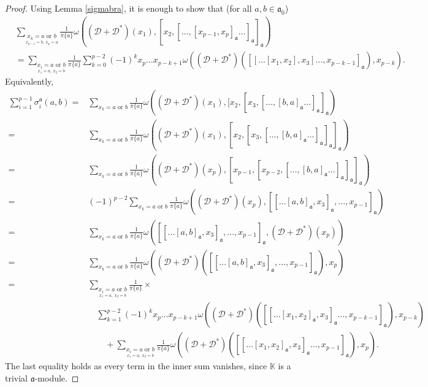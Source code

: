 \documentclass[pdftex]{sigma}
\numberwithin{equation}{section}
\begin{document}
\begin{proof}
Using Lemma \ref{sigmabra}, it is enough to show that (for all $a,b\in \mathfrak{a}_{\bar 0}$)
\begin{align*}
 &\sum_{\underset{x_{p-1}=b,~x_p=a}{x_k=a \text{ or } b}}\frac{1}{\pi\{a\}}\omega( ({\mathscr D}+{\mathscr D}^*)(x_1),[x_2,[\dots ,[x_{p-1},x_p]_{\mathfrak{a}}\dots ]_{\mathfrak{a}}]_{\mathfrak{a}} )\\
 &= \sum_{\underset{x_1=a,~x_2=b}{x_i=a \text{ or } b}}\frac{1}{\pi\{a\}}\sum_{k=0}^{p-2}(-1)^kx_p\dots x_{p-k+1}\omega(({\mathscr D}+{\mathscr D}^*)([[\dots [x_1,x_2],x_3]\dots ,x_{p-k-1}]_{\mathfrak{a}}),x_{p-k}).
\end{align*}
Equivalently,
\begin{align*}
 \sum_{i=1}^{p-1}\sigma_i^{\mathfrak{a}}(a,b)
 =&\sum_{x_k=a \text{ or } b}\frac{1}{\pi\{a\}} \omega( ({\mathscr D}+{\mathscr D}^*)(x_1),[x_2,[x_3,[\dots ,[b,a]_{\mathfrak{a}}\dots ]_{\mathfrak{a}} ]_{\mathfrak{a}} )\\
 =&\sum_{x_k=a \text{ or } b}\frac{1}{\pi\{a\}} \omega( ({\mathscr D}+{\mathscr D}^*)(x_1),[x_2,[x_3,[\dots ,[b,a]_{\mathfrak{a}}\dots ]_{\mathfrak{a}} ]_{\mathfrak{a}} ]_{\mathfrak{a}} )\\
 =&\sum_{x_k=a \text{ or } b}\frac{1}{\pi\{a\}} \omega( ({\mathscr D}+{\mathscr D}^*)(x_p),[x_{p-1},[x_{p-2},[\dots ,[b,a]_{\mathfrak{a}}\dots ]_{\mathfrak{a}} ]_{\mathfrak{a}} ]_{\mathfrak{a}} )\\
 =&(-1)^{p-2}\sum_{x_k=a \text{ or } b}\frac{1}{\pi\{a\}} \omega( ({\mathscr D}+{\mathscr D}^*)(x_p),[[\dots [a,b]_{\mathfrak{a}},x_3]_{\mathfrak{a}},\dots ,x_{p-1}]_{\mathfrak{a}} )\\
 =&\sum_{x_k=a \text{ or } b}\frac{1}{\pi\{a\}} \omega( [[\dots [a,b]_{\mathfrak{a}},x_3]_{\mathfrak{a}},\dots ,x_{p-1}]_{\mathfrak{a}},({\mathscr D}+{\mathscr D}^*)(x_p) )\\
 =&\sum_{x_k=a \text{ or } b}\frac{1}{\pi\{a\}} \omega(({\mathscr D}+{\mathscr D}^*)( [[\dots [a,b]_{\mathfrak{a}},x_3]_{\mathfrak{a}},\dots ,x_{p-1}]_{\mathfrak{a}}),x_p )\\
 =&\sum_{\underset{x_1=a,~x_2=b}{x_i=a \text{ or } b}}\frac{1}{\pi\{a\}}\times\\
 &\quad\sum_{k=1}^{p-2}(-1)^kx_p\dots x_{p-k+1}\omega(({\mathscr D}+{\mathscr D}^*)([[\dots [x_1,x_2]_\mathfrak{a},x_3]_\mathfrak{a}\dots ,x_{p-k-1}]_{\mathfrak{a}}),x_{p-k})\\
 &\qquad+ \sum_{\underset{x_1=a,~x_2=b}{x_i=a \text{ or } b}}\frac{1}{\pi\{a\}}\omega(({\mathscr D}+{\mathscr D}^*)([[\dots [x_1,x_2]_\mathfrak{a},x_3]_\mathfrak{a}\dots ,x_{p-1}]_{\mathfrak{a}}),x_{p}).
\end{align*}
The last equality holds as every term in the inner sum  vanishes, since $\mathbb{K}$ is a trivial $\mathfrak{a}$-module.
\end{proof}
\end{document}
